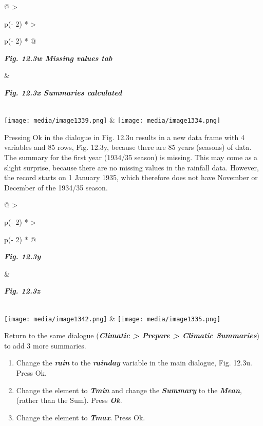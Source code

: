 \documentclass[
  letterpaper,
  DIV=11,
  numbers=noendperiod]{scrreprt}
\begin{document}
\begin{longtable}[]{@{}
  >{\raggedright\arraybackslash}p{(\columnwidth - 2\tabcolsep) * }
  >{\raggedright\arraybackslash}p{(\columnwidth - 2\tabcolsep) * }@{}}
\toprule\noalign{}
\begin{minipage}[b]{\linewidth}\raggedright
\textbf{\emph{Fig. 12.3w Missing values tab}}
\end{minipage} & \begin{minipage}[b]{\linewidth}\raggedright
\textbf{\emph{Fig. 12.3x Summaries calculated}}
\end{minipage} \\
\midrule\noalign{}
\endhead
\bottomrule\noalign{}
\endlastfoot
\texttt{[image: media/image1339.png]}
&
\texttt{[image: media/image1334.png]} \\
\end{longtable}

Pressing Ok in the dialogue in Fig. 12.3u results in a new data frame
with 4 variables and 85 rows, Fig. 12.3y, because there are 85 years
(seasons) of data. The summary for the first year (1934/35 season) is
missing. This may come as a slight surprise, because there are no
missing values in the rainfall data. However, the record starts on 1
January 1935, which therefore does not have November or December of the
1934/35 season.

\begin{longtable}[]{@{}
  >{\raggedright\arraybackslash}p{(\columnwidth - 2\tabcolsep) * }
  >{\raggedright\arraybackslash}p{(\columnwidth - 2\tabcolsep) * }@{}}
\toprule\noalign{}
\begin{minipage}[b]{\linewidth}\raggedright
\textbf{\emph{Fig. 12.3y}}
\end{minipage} & \begin{minipage}[b]{\linewidth}\raggedright
\textbf{\emph{Fig. 12.3z}}
\end{minipage} \\
\midrule\noalign{}
\endhead
\bottomrule\noalign{}
\endlastfoot
\texttt{[image: media/image1342.png]} &
\texttt{[image: media/image1335.png]} \\
\end{longtable}

Return to the same dialogue (\textbf{\emph{Climatic \textgreater{}
Prepare \textgreater{} Climatic Summaries}}) to add 3 more summaries.

\begin{enumerate}
\def\labelenumi{\alph{enumi})}
\item
  Change the \textbf{\emph{rain}} to the \textbf{\emph{rainday}}
  variable in the main dialogue, Fig. 12.3u. Press Ok.
\item
  Change the element to \textbf{\emph{Tmin}} and change the
  \textbf{\emph{Summary}} to the \textbf{\emph{Mean}}, (rather than the
  Sum). Press \textbf{\emph{Ok}}.
\item
  Change the element to \textbf{\emph{Tmax}}. Press Ok.
\end{enumerate}
\end{document}
